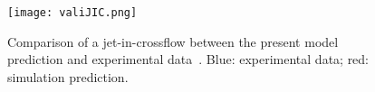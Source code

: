     \begin{figure}[htb]
        \begin{center}
            \texttt{[image: valiJIC.png]}
        \end{center}
        \caption{Comparison of a jet-in-crossflow between the present model prediction and experimental data~\cite{su2004simultaneous}. Blue: experimental data; red: simulation prediction.}
        \label{valiJIC}
    \end{figure}









